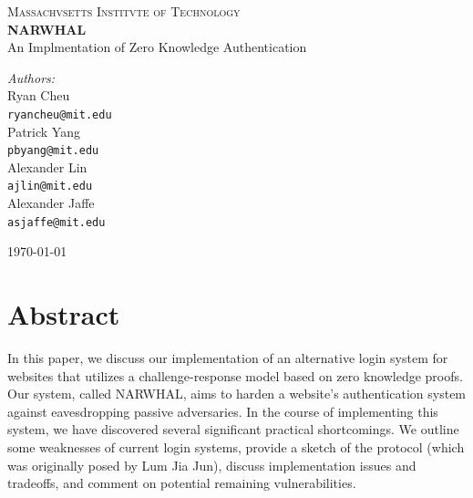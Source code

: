 \documentclass[11pt]{article}
\begin{document}
\begin{titlepage}

\begin{center}

\textsc{\LARGE Massachvsetts Institvte of Technology}\\[0.5cm]


{ \huge \bfseries NARWHAL \\[0.4cm] }
{\Large An Implmentation of Zero Knowledge Authentication}\\[0.5cm]


\begin{minipage}{0.4\textwidth}
\begin{flushleft} \large
\emph{Authors:}\\[0.5cm]
Ryan Cheu \\
{\tt ryancheu@mit.edu} \\[1cm]
Patrick Yang \\
{\tt pbyang@mit.edu} \\[1cm]
Alexander Lin \\
{\tt ajlin@mit.edu} \\[1cm]
Alexander Jaffe \\
{\tt asjaffe@mit.edu}
\end{flushleft}
\end{minipage}
\begin{minipage}{0.4\textwidth}
\begin{flushright} \large

\end{flushright}
\end{minipage}

\vfill

{\large \today}

\end{center}

\end{titlepage}

\section{Abstract}

In this paper, we discuss our implementation of an alternative login system for websites that utilizes a challenge-response model based on zero knowledge proofs.  Our system, called NARWHAL, aims to harden a website's authentication system against eavesdropping passive adversaries.  In the course of implementing this system, we have discovered several significant practical shortcomings.  We outline some weaknesses of current login systems, provide a sketch of the protocol (which was originally posed by Lum Jia Jun), discuss implementation issues and tradeoffs, and comment on potential remaining vulnerabilities.
\end{document}
